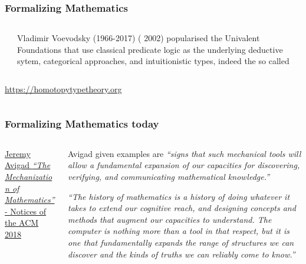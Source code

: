 \documentclass[10pt]{beamer}
\begin{document}
\begin{frame}\frametitle{Formalizing Mathematics}



\begin{columns}
\begin{column}{0.2\textwidth} 
\end{column}
\begin{column}{0.6\textwidth} Vladimir Voevodsky (1966-2017) ( 2002) popularised the {\color{blue}
    Univalent Foundations} that use classical predicate logic as the
  underlying deductive sytem, categorical approaches, and intuitionistic types,
  indeed the so called
\end{column}
\end{columns}

\vspace{5mm}

\begin{columns}
\begin{column}{0.5\textwidth} \url{https://homotopytypetheory.org}
\end{column}
\begin{column}{0.4\textwidth}   \end{column}
\end{columns}

\end{frame}


\begin{frame}\frametitle{Formalizing Mathematics today}


  \begin{columns}
\begin{column}{0.3\textwidth}\href{http://dx.doi.org/10.1090/noti1688}{\color{blue}
  \scriptsize{Jeremy Avigad  {\it ``The Mechanization of
      Mathematics''}} - Notices of the ACM 2018}
\end{column}

\begin{column}{0.6\textwidth}
  \small{Avigad given  examples are {\it ``signs that such mechanical tools will allow
a fundamental expansion of our capacities for discovering, verifying,
and communicating mathematical knowledge.''}

\vspace{5mm}

{\it ``The history of mathematics is a history of doing whatever
it takes to extend our cognitive reach, and designing
concepts and methods that augment our capacities to
understand. The computer is nothing more than a tool
in that respect, but it is one that fundamentally expands
the range of structures we can discover and the kinds of
truths we can reliably come to know.''}
}
\end{column}
\end{columns}

\end{frame}  
\end{document}
